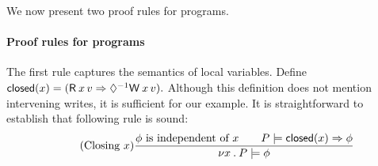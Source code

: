 We now present two proof rules for programs. 

\paragraph*{Proof rules for programs}
The first rule captures the semantics of
local variables.  Define
\begin{math}
  \closed(\aLoc) = (\DR{\aLoc}{\aVal} \Rightarrow \once \DW{\aLoc}{\aVal}).
\end{math}
Although this definition does not mention intervening writes, it is
sufficient for our example.  It is straightforward to establish that
following rule is sound:
\begin{displaymath}
  \tag{Closing $\aLoc$}
  \frac{
    \afo \text{ is independent of } \aLoc
    \qquad
    \aPS \models \closed(\aLoc) \Rightarrow \afo
  }{
    \nu \aLoc \st \aPS \models \afo
  }
\end{displaymath}

